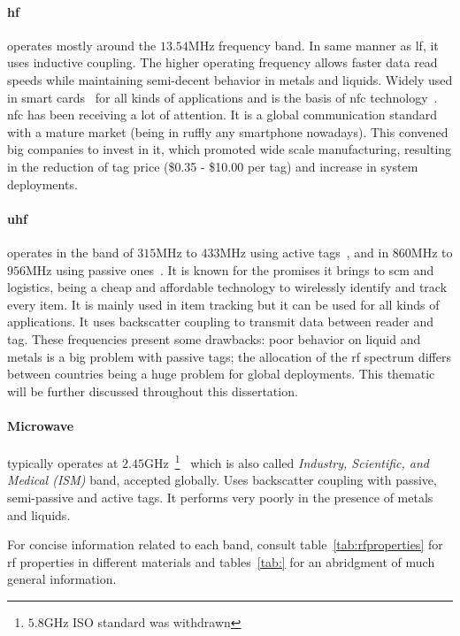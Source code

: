 \paragraph*{\ac{hf}} operates mostly around the $13.54$MHz frequency band. In same manner as \ac{lf}, it uses inductive coupling. The higher operating frequency allows faster data read speeds while maintaining semi-decent behavior in metals and liquids.
Widely used in smart cards~\cite{isoISOIEC156932, MIFARE} for all kinds of applications and is the basis of \ac{nfc} technology~\cite{isoISOIEC144434, isoISOIEC180003}. \ac{nfc} has been receiving a lot of attention. It is a global communication standard with a mature market (being in ruffly any smartphone nowadays). This convened big companies to invest in it, which promoted wide scale manufacturing, resulting in the reduction of tag price (\$0.35 - \$10.00 per tag) and increase in system deployments.

\paragraph*{\ac{uhf}} operates in the band of $315$MHz to $433$MHz using active tags~\cite{isoISOIEC180007}, and in $860$MHz to $956$MHz using passive ones~\cite{isoISOIEC180006}. It is known for the promises it brings to \ac{scm} and logistics, being a cheap and affordable technology to wirelessly identify and track every item. It is mainly used in item tracking but it can be used for all kinds of applications. It uses backscatter coupling to transmit data between reader and tag. These frequencies present some drawbacks: poor behavior on liquid and metals is a big problem with passive tags; the allocation of the \ac{rf} spectrum differs between countries being a huge problem for global deployments. This thematic will be further discussed throughout this dissertation.

\paragraph*{Microwave} typically operates at $2.45$GHz~\footnote{$5.8$GHz ISO standard was withdrawn}~\cite{isoISOIEC180004} which is also called \emph{Industry, Scientific, and Medical (ISM)} band, accepted globally. Uses backscatter coupling with passive, semi-passive and active tags. It performs very poorly in the presence of metals and liquids. 

For concise information related to each band, consult table~\ref{tab:rfproperties} for \ac{rf} properties in different materials and tables~\ref{tab:} for an abridgment of much general information.

